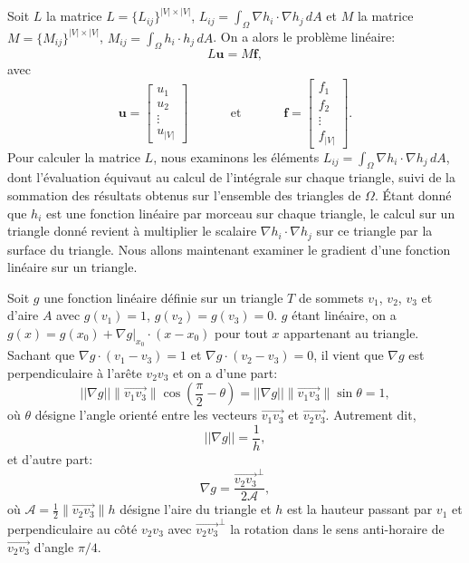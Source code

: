 Soit \(L\) la matrice \(L = \{L_{ij}\}^{|V|\times|V|}\), \(L_{ij} = \displaystyle\int_{\Omega} \nabla h_i \cdot \nabla h_j \,dA\) et \(M\) la matrice \(M = \{M_{ij}\}^{|V|\times|V|}\), \(M_{ij} = \displaystyle\int_{\Omega} h_i \cdot h_j \,dA\). On a alors le problème linéaire:
$$
L\mathbf{u}=M\mathbf{f},
$$
avec
\[
\mathbf{u}=\begin{bmatrix}
u_1\\
u_2\\
\vdots \\
u_{|V|}
\end{bmatrix}
\quad\quad\quad\mbox{ et }\quad\quad\quad
\mathbf{f}=
\begin{bmatrix}
f_1\\
f_2\\
\vdots \\
f_{|V|}
\end{bmatrix}.
\]
Pour calculer la matrice \(L\), nous examinons les éléments \(L_{ij} = \displaystyle\int_{\Omega} \nabla h_i \cdot \nabla h_j \,dA\), dont l'évaluation équivaut au calcul de l'intégrale sur chaque triangle, suivi de la sommation des résultats obtenus sur l'ensemble des triangles de \(\Omega\). Étant donné que \(h_i\) est une fonction linéaire par morceau sur chaque triangle, le calcul sur un triangle donné revient à multiplier le scalaire \(\nabla h_i \cdot \nabla h_j\) sur ce triangle par la surface du triangle. Nous allons maintenant examiner le gradient d'une fonction linéaire sur un triangle.

Soit \(g\) une fonction linéaire définie sur un triangle \(T\) de sommets \(v_1\), \(v_2\), \(v_3\) et d'aire \(A\) avec \(g(v_1) = 1\), \(g(v_2) = g(v_3) = 0\). \(g\) étant linéaire, on a \(g(x) = g(x_0) + \nabla g |_{x_0} \cdot (x - x_0)\) pour tout \(x\) appartenant au triangle.
Sachant que \(\nabla g \cdot (v_1 - v_3) = 1\) et \(\nabla g \cdot (v_2 - v_3) = 0\), il vient que \(\nabla g\) est perpendiculaire à l'arête \(v_2v_3\) et on a d'une part:
\[
||\nabla g|| \|\overrightarrow{v_1v_3}\| \cos\left(\displaystyle\frac{\pi}{2} - \theta\right) = ||\nabla g|| \|\overrightarrow{v_1v_3}\| \sin \theta=1,
\]
où $\theta$ désigne l'angle orienté entre les vecteurs $\overrightarrow{v_1v_3}$ et $\overrightarrow{v_2v_3}$. Autrement dit,
\begin{equation}
||\nabla g||=\frac{1}{h},
\label{eqn:ca_passe}
\end{equation}
et d'autre part:
\begin{equation}
\nabla g= \displaystyle\frac{\overrightarrow{v_2v_3}^\perp}{2\mathcal{A}},
\label{eqn:ca_casse}
\end{equation}
où $\mathcal{A}=\displaystyle\frac{1}{2} \|\overrightarrow{v_2v_3}\|h$ désigne l'aire du triangle et $h$ est la hauteur passant par $v_1$ et perpendiculaire au côté $v_2v_3$ avec \(\overrightarrow{v_2v_3}^\perp\) la rotation dans le sens anti-horaire de \(\overrightarrow{v_2v_3}\) d'angle \(\pi/4\).

